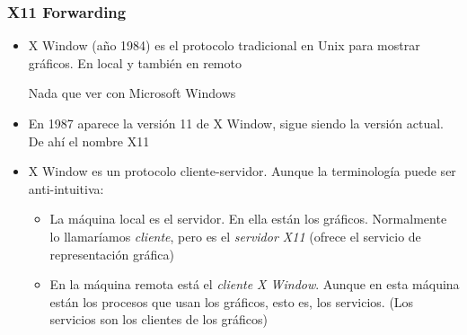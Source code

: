 \documentclass[ucs]{beamer}
\begin{document}
\begin{frame}[fragile]
\frametitle{X11 Forwarding}
\begin{itemize}
\item
X Window (año 1984) es el protocolo tradicional en Unix para mostrar gráficos. En local
y también en remoto

Nada que ver con Microsoft Windows

\item
En 1987 aparece la versión 11 de X Window, sigue siendo la versión actual. De ahí el
nombre X11


\item
X Window es un protocolo cliente-servidor. Aunque la terminología puede ser
anti-intuitiva:


\begin{itemize}
\item
La máquina local es el servidor. En ella están los gráficos.
Normalmente lo llamaríamos \emph{cliente},
pero es el \emph{servidor X11} (ofrece el servicio de representación gráfica)

\item
En la máquina remota está
el \emph{cliente X Window}. Aunque en esta máquina 
están los procesos que usan los gráficos, esto es,
los servicios. (Los servicios son los clientes de los
gráficos) 

\end{itemize}


\end{itemize}
\end{frame}
\end{document}
